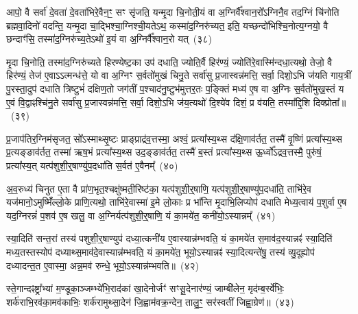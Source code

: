 आपो॒ वै सर्वा॑ दे॒वता॑ दे॒वता॑भिरे॒वैन॒ꣳ॒ सꣳ सृ॑जति॒ यन्मृ॒दा चि॒नोती॒यं वा अ॒ग्निर्वै᳚श्वान॒रो᳚\-ऽग्निनै॒व तद॒ग्निं चि॑नोति ब्रह्मवा॒दिनो॑ वदन्ति॒ यन्मृ॒दा चा॒द्भिश्चा॒ग्निश्ची॒यते\-ऽथ॒ कस्मा॑द॒ग्निरु॑च्यत॒ इति॒ यच्छन्दो॑भिश्चि॒नोत्य॒ग्नयो॒ वै छन्दाꣳ॑सि॒ तस्मा॑द॒ग्निरु॑च्य॒ते\-ऽथो॑ इ॒यं वा अ॒ग्निर्वै᳚श्वान॒रो यत्~(३८)

मृ॒दा चि॒नोति॒ तस्मा॑द॒ग्निरु॑च्यते हिरण्येष्ट॒का उप॑ दधाति॒ ज्योति॒र्वै हिर॑ण्यं॒ ज्योति॑रे॒वास्मि॑न्दधा॒त्यथो॒ तेजो॒ वै हिर॑ण्यं॒ तेज॑ ए॒वा\-ऽऽ\-त्मन्ध॑त्ते॒ यो वा अ॒ग्निꣳ स॒र्वतो॑मुखं चिनु॒ते सर्वा॑सु प्र॒जास्वन्न॑मत्ति॒ सर्वा॒ दिशो॒\-ऽभि ज॑यति गाय॒त्रीं पु॒रस्ता॒दुप॑ दधाति त्रिष्टुभं॑ दक्षिण॒तो जग॑तीं प॒श्चाद॑नु॒ष्टुभ॑मुत्तर॒तः प॒ङ्क्तिं मध्य॑ ए॒ष वा अ॒ग्निः स॒र्वतो॑मुख॒स्तं य ए॒वं वि॒द्वाꣴश्चि॑नु॒ते सर्वा॑सु प्र॒जास्वन्न॑मत्ति॒ सर्वा॒ दिशो॒\-ऽभि ज॑य॒त्यथो॑ दि॒श्ये॑व दिशं॒ प्र व॑यति॒ तस्मा᳚द्दि॒शि दिक्प्रोता᳚॥~(३९)

{\anuvakamend[{अपि॑ सं॒ यौति॑ वैश्वान॒रो यदे॒ष वै पञ्च॑विꣳशतिश्च}]}%

प्र॒जा\-प॑तिर॒ग्निम॑सृजत॒ सो᳚\-ऽस्माथ्सृ॒ष्टः प्राङ्प्राद्र॑व॒त्तस्मा॒ अश्वं॒ प्रत्या᳚स्य॒थ्स द॑क्षि॒णाव॑र्तत॒ तस्मै॑ वृ॒ष्णिं प्रत्या᳚स्य॒थ्स प्र॒त्यङ्ङाव॑र्तत॒ तस्मा॑ ऋष॒भं प्रत्या᳚स्य॒थ्स उद॒ङ्ङाव॑र्तत॒ तस्मै॑ ब॒स्तं प्रत्या᳚स्य॒थ्स ऊ॒र्ध्वो᳚\-ऽद्रव॒त्तस्मै॒ पुरु॑षं॒ प्रत्या᳚स्य॒त् यत्प॑शुशी॒र्॒\mbox{}षाण्यु॑प॒दधा॑ति स॒र्वत॑ ए॒वैनम्᳚~(४०)

अ॒व॒रुध्य॑ चिनुत ए॒ता वै प्रा॑ण॒भृत॒श्चक्षु॑ष्मती॒रिष्ट॑का॒ यत्प॑शुशी॒र्॒\mbox{}षाणि॒ यत्प॑शुशी॒र्॒\mbox{}षाण्यु॑प॒दधा॑ति॒ ताभि॑रे॒व यज॑मानो॒\-ऽमुष्मिँ॑ल्लो॒के प्राणि॒त्यथो॒ ताभि॑रे॒वास्मा॑ इ॒मे लो॒काः प्र भा᳚न्ति मृ॒दाभि॒लिप्योप॑ दधाति मेध्य॒त्वाय॑ प॒शुर्वा ए॒ष यद॒ग्निरन्नं॑ प॒शव॑ ए॒ष खलु॒ वा अ॒ग्निर्यत्प॑शुशी॒र्॒\mbox{}षाणि॒ यं का॒मये॑त॒ कनी॑यो॒\-ऽस्यान्नम्᳚~(४१)

स्या॒दिति॑ सन्त॒रां तस्य॑ पशुशी॒र्॒\mbox{}षाण्युप॑ दध्या॒त्कनी॑य ए॒वास्यान्न॑म्भवति॒ यं का॒मये॑त स॒माव॑द॒स्यान्नꣴ॑ स्या॒दिति॑ मध्य॒तस्तस्योप॑ दध्याथ्स॒माव॑दे॒वास्यान्न॑म्भवति॒ यं का॒मये॑त॒ भूयो॒\-ऽस्यान्नꣴ॑ स्या॒दित्यन्ते॑षु॒ तस्य॑ व्यु॒दूह्योप॑ दध्यादन्त॒त ए॒वास्मा॒ अन्न॒मव॑ रुन्धे॒ भूयो॒\-ऽस्यान्न॑म्भवति॥~(४२)

{\anuvakamend[{ए॒न॒म॒स्यान्न॒म्भूयो॒स्यान्न॑म्भवति}]}%

स्ते॒गान्दꣴष्ट्रा᳚भ्यां म॒ण्डूका॒ञ्जम्भ्ये॑भि॒राद॑कां खा॒देनोर्जꣳ॑ सꣳसू॒देनार॑ण्यं॒ जाम्बी॑लेन॒ मृद॑म्ब॒र्स्वे॑भिः॒ शर्क॑राभि॒रव॑का॒मव॑काभिः॒ शर्क॑रामुथ्सा॒देन॑ जि॒ह्वाम॑वक्र॒न्देन॒ तालु॒ꣳ॒ सर॑स्वतीं जिह्वा॒ग्रेण॑॥~(४३)

